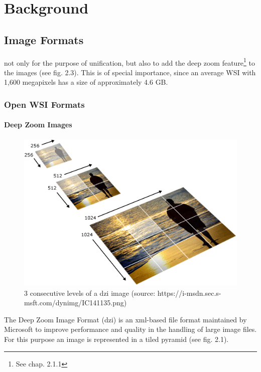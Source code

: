 \chapter{Background}
\section{Image Formats}
not only for the purpose of unification, but also to add the deep zoom feature\footnote{See chap. 2.1.1} to the images (see fig. 2.3). This is of special importance, since an average WSI with 1,600 megapixels has a size of approximately 4.6 GB\cite{Farahanil15}.


\subsection{Open WSI Formats}
\subsubsection{Deep Zoom Images}

\begin{figure}[H]
	\begin{center}
		\includegraphics[scale=0.5]{img/dzi_pyramid.png}
		\caption{3 consecutive levels of a dzi image (source: https://i-msdn.sec.s-msft.com/dynimg/IC141135.png)}
		\label{fig:fig2.1}
	\end{center}
\end{figure}

The Deep Zoom Image Format (dzi) is an xml-based file format maintained by Microsoft to improve performance and quality in the handling of large image files. For this purpose an image is represented in a tiled pyramid (see fig. 2.1).

